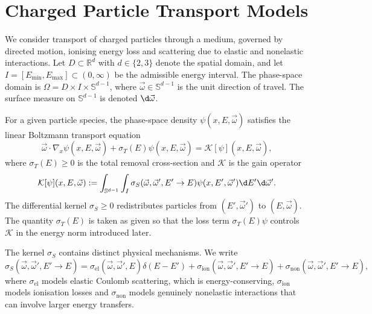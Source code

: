 \documentclass[final]{amsart}
\begin{document}
\section{Charged Particle Transport Models}
\label{sec:models}

We consider transport of charged particles through a medium, governed
by directed motion, ionising energy loss and scattering due to elastic
and nonelastic interactions. Let $D \subset \mathbb{R}^d$ with
$d \in \{2,3\}$ denote the spatial domain, and let
$I = [E_{\min},E_{\max}] \subset (0,\infty)$ be the admissible energy
interval. The phase-space domain is $\Omega = D \times I \times
\mathbb{S}^{d-1}$, where $\vec{\omega} \in \mathbb{S}^{d-1}$ is the
unit direction of travel. The surface measure on $\mathbb{S}^{d-1}$ is
denoted $\d\vec{\omega}$.

For a given particle species, the phase-space density
$\psi(x,E,\vec{\omega})$ satisfies the linear Boltzmann transport
equation
\begin{equation}
  \label{eq:BTE-general}
  \vec{\omega}\cdot\nabla_x \psi(x,E,\vec{\omega})
  + \sigma_T(E)\psi(x,E,\vec{\omega})
  =
  \mathcal{K}[\psi](x,E,\vec{\omega}),
\end{equation}
where $\sigma_T(E)\ge 0$ is the total removal cross-section and
$\mathcal{K}$ is the gain operator
\begin{equation}
  \label{eq:Kop-general}
  \mathcal{K}[\psi](x,E,\vec{\omega})
  :=
  \int_{\mathbb{S}^{d-1}} \int_{I}
  \sigma_S(\vec{\omega},\vec{\omega}',E' \to E)
  \psi(x,E',\vec{\omega}')  \d E'  \d\vec{\omega}'.
\end{equation}
The differential kernel $\sigma_S \ge 0$ redistributes particles from
$(E',\vec{\omega}')$ to $(E,\vec{\omega})$. The quantity $\sigma_T(E)$
is taken as given so that the loss term $\sigma_T(E)\psi$ controls
$\mathcal{K}$ in the energy norm introduced later.

The kernel $\sigma_S$ contains distinct physical mechanisms. We write
\begin{equation}
  \label{eq:kernel-decomp}
  \sigma_S(\vec{\omega},\vec{\omega}',E' \to E)
  =
  \sigma_{\text{el}}(\vec{\omega},\vec{\omega}',E) \delta(E-E')
  +
  \sigma_{\text{ion}}(\vec{\omega},\vec{\omega}',E' \to E)
  +
  \sigma_{\text{non}}(\vec{\omega},\vec{\omega}',E' \to E),
\end{equation}
where $\sigma_{\text{el}}$ models elastic Coulomb scattering, which is
energy-conserving, $\sigma_{\text{ion}}$ models ionisation losses and
$\sigma_{\text{non}}$ models genuinely nonelastic interactions that can
involve larger energy transfers.
\end{document}
